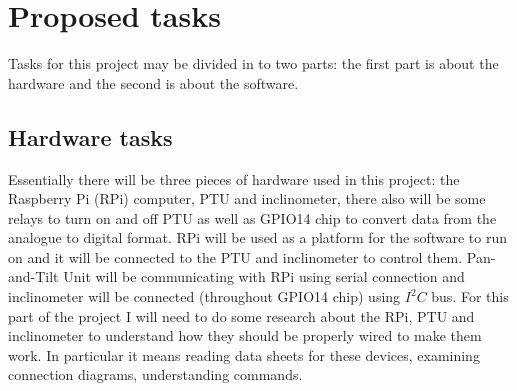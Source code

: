 \documentclass[11pt,fleqn,twoside]{article}
\begin{document}
\section{Proposed tasks}

Tasks for this project may be divided in to two parts: the first part is about the hardware and the second is about the software. 

\subsection{Hardware tasks}
Essentially there will be three pieces of hardware used in this project: the Raspberry Pi (RPi) computer, PTU and inclinometer, there also will be some relays to turn on and off PTU as well as GPIO14 chip to convert data from the analogue to digital format. RPi will be used as a platform for the software to run on and it will be connected to the PTU and inclinometer to control them. Pan-and-Tilt Unit will be communicating with RPi using serial connection and inclinometer will be connected (throughout GPIO14 chip) using \begin{math}I^2 C\end{math} bus. For this part of the project I will need to do some research about the RPi, PTU and inclinometer to understand how they should be properly wired to make them work. In particular it means reading data sheets for these devices, examining connection diagrams, understanding commands.
\end{document}
